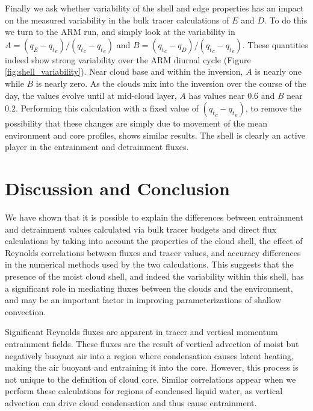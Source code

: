 \documentclass[draft,grl]{agutex}
\begin{document}
\begin{article}
Finally we ask whether variability of the shell and edge properties has an 
impact on the measured variability in the bulk tracer calculations of $E$ and 
$D$.  To do this we turn to the ARM run, and simply look at the variability in 
$A = (q_E - {q_t}_e)/({q_t}_c - {q_t}_e)$ and 
$B = ({q_t}_c - q_D)/({q_t}_c - {q_t}_e)$.  These quantities indeed show 
strong variability over the ARM diurnal cycle (Figure 
\ref{fig:shell_variability}).  Near cloud base and within the inversion, $A$ 
is nearly one while $B$ is nearly zero.  As the clouds mix into the inversion 
over the course of the day, the values evolve until at mid-cloud layer, $A$ 
has values near 0.6 and $B$ near 0.2.  Performing this calculation with a fixed 
value of $({q_t}_c - {q_t}_e)$, to remove the possibility that these changes 
are simply due to movement of the mean environment and core profiles, shows 
similar results.  The shell is clearly an active player in the entrainment and 
detrainment fluxes.


\section{Discussion and Conclusion}

We have shown that it is possible to explain the differences between entrainment and 
detrainment values calculated via bulk tracer budgets and direct flux 
calculations by taking into account the properties of the cloud shell, the 
effect of Reynolds correlations between fluxes and tracer values, and 
accuracy differences in the numerical methods used by the two calculations.
This suggests that the presence of the moist cloud shell, and indeed the 
variability within this shell, has a significant role in mediating fluxes 
between the clouds and the environment, and may be an important factor in 
improving parameterizations of shallow convection.

Significant Reynolds fluxes are apparent in tracer and vertical momentum 
entrainment fields.  These fluxes are the result of vertical advection of 
moist but negatively buoyant air into a region where condensation causes 
latent heating, making the air buoyant and entraining it into the core.
However, this process is not unique to the definition of cloud core.  Similar 
correlations appear when we perform these calculations for regions of
condensed liquid water, as vertical advection can drive cloud condensation and 
thus cause entrainment.


\end{article}
\end{document}
